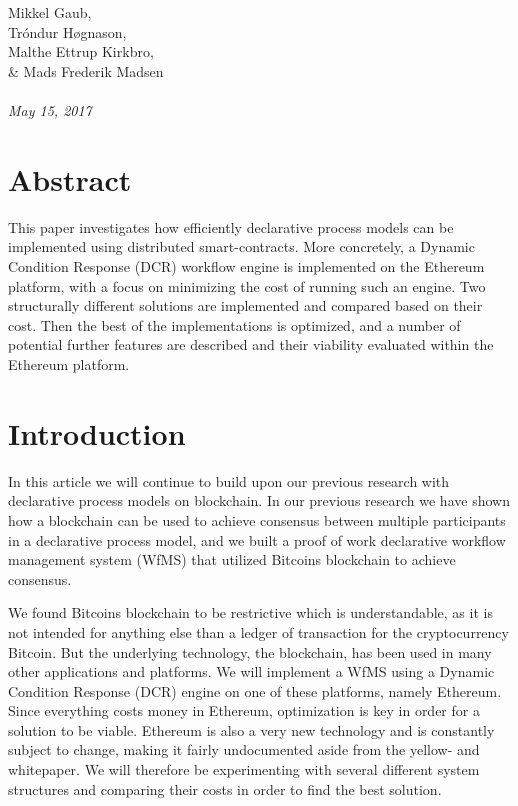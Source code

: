 \documentclass{article}
\begin{document}
\normalem
	\begin{titlepage}
		 \\ \\
		Mikkel Gaub, \\ Tróndur Høgnason, \\ Malthe Ettrup Kirkbro, \\ \& Mads Frederik Madsen	\\ \\
		\hspace{-18pt}
		\textit{May 15, 2017}
		\vspace{\fill}
		\section*{Abstract}
		This paper investigates how efficiently declarative process models can be implemented using distributed smart-contracts. 
		More concretely, a Dynamic Condition Response (DCR) workflow engine is implemented on the Ethereum platform, with a focus on minimizing the cost of running such an engine. 
		Two structurally different solutions are implemented and compared based on their cost.
		Then the best of the implementations is optimized, and a number of potential further features are described and their viability evaluated within the Ethereum platform.
		\thispagestyle{empty}
	\end{titlepage}
	\clearpage

	\setcounter{page}{1}

	\setcounter{tocdepth}{2}
	\tableofcontents
	\pagebreak

	\section{Introduction}
	In this article we will continue to build upon our previous research with declarative process models on blockchain. 
	In our previous research we have shown how a blockchain can be used to achieve consensus between multiple participants in a declarative process model, and we built a proof of work declarative workflow management system (WfMS) that utilized Bitcoins blockchain to achieve consensus.
 
	We found Bitcoins blockchain to be restrictive which is understandable, as it is not intended for anything else than a ledger of transaction for the cryptocurrency Bitcoin. 
	But the underlying technology, the blockchain, has been used in many other applications and platforms. 
	We will implement a WfMS using a Dynamic Condition Response (DCR) engine on one of these platforms, namely Ethereum.
	Since everything costs money in Ethereum, optimization is key in order for a solution to be viable.
	Ethereum is also a very new technology and is constantly subject to change, making it fairly undocumented aside from the yellow- and whitepaper.
	We will therefore be experimenting with several different system structures and comparing their costs in order to find the best solution.
\end{document}
